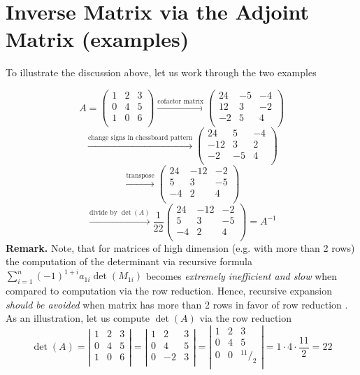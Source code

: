 \documentclass[8pt]{article} %
\newcommand{\myfrac}[2]{^{#1}/_{#2}}
\begin{document}
\section{Inverse Matrix via the Adjoint Matrix (examples)}
To illustrate the discussion above, let us work through the two examples
\begin{myeg}
\[A=\left(\begin{array}{rrr}
1&2&3\\
0&4&5\\
1&0&6\\
\end{array}\right)
	\xrightarrow{\text{cofactor matrix}}\left(\begin{array}{rrr}
24&-5&-4\\
12&3&-2\\
-2&5&4\\
\end{array}\right)
		\]
	\[\xrightarrow{\text{change signs in chessboard pattern}}
\left(\begin{array}{rrr}24&5&-4\\
-12&3&2\\
-2&-5&4\\
\end{array}\right)
		\]
	\[\xrightarrow{\text{transpose}}
\left(\begin{array}{rrr}
24&-12&-2\\
5&3&-5\\
-4&2&4\\
\end{array}\right)
		\]
		\[\xrightarrow{\text{divide by $\det(A)$}}\frac{1}{22}
\left(\begin{array}{rrr}
24&-12&-2\\
5&3&-5\\
-4&2&4\\
\end{array}\right)
		=A^{-1}\]
\textbf{Remark. } Note, that for matrices of high dimension (e.g. with {more }than 2 rows) the computation of the determinant via recursive
formula $\sum_{i=1}^n (-1)^{1+i}a_{1i}\det(M_{1i})$ becomes \textit{extremely inefficient and slow
} when compared to computation via the row reduction. Hence, recursive expansion
\textit{should be avoided} when matrix has more than 2 rows in favor of row reduction
. As an illustration, let us compute $\det(A)$ via the row reduction
\[
\det(A)=
\left|\begin{array}{rrr}
1&2&3\\
0&4&5\\
1&0&6\\
\end{array}\right|=
\left|\begin{array}{rrr}
1&2&3\\
0&4&5\\
0&-2&3\\
\end{array}\right|=
\left|\begin{array}{rrr}
1&2&3\\
0&4&5\\
0&0&\myfrac{11}{2}\\
\end{array}\right|=1\cdot4\cdot\frac{11}{2}=22
\]
\end{myeg}
\end{document}
